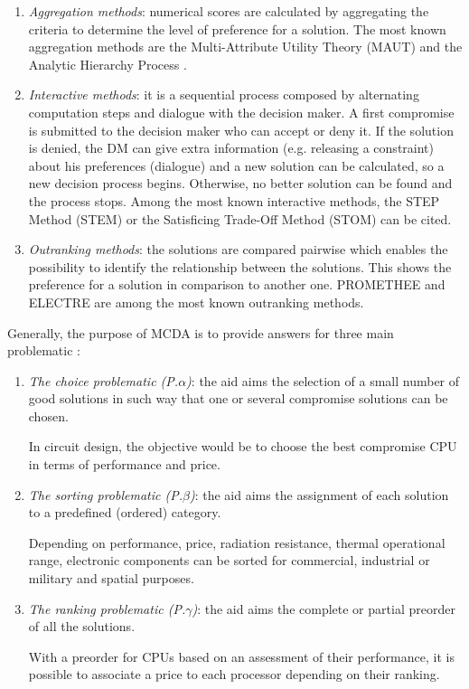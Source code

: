 \begin{enumerate}
\item \textit{Aggregation methods}: numerical scores are calculated by aggregating the criteria to determine the level of preference for a solution. The most known aggregation methods are the Multi-Attribute Utility Theory (MAUT) \cite{MMAUT} and the Analytic Hierarchy Process \cite{MAHP}.
\item \textit{Interactive methods}: it is a sequential process composed by alternating computation steps and dialogue with the decision maker. A first compromise is submitted to the decision maker who can accept or deny it. If the solution is denied, the DM can give extra information (e.g. releasing a constraint) about his preferences (dialogue) and a new solution can be calculated, so a new decision process begins. Otherwise, no better solution can be found and the process stops. Among the most known interactive methods, the STEP Method (STEM) \cite{benayoun71} or the Satisficing Trade-Off Method (STOM) \cite{nakayama84} can be cited.
\item \textit{Outranking methods}: the solutions are compared pairwise which enables the possibility to identify the relationship between the solutions. This shows the preference for a solution in comparison to another one. PROMETHEE \cite{Brans1} and ELECTRE \cite{Roy66} are among the most known outranking methods.
\end{enumerate}


Generally, the purpose of MCDA is to provide answers for three main problematic \cite{EhrgottFigueiraGreco2005}:
\begin{enumerate}
\item \textit{The choice problematic (P.$\alpha$)}: the aid aims the selection of a small number of good solutions in such way that one or several compromise solutions can be chosen.
\begin{example}
In circuit design, the objective would be to choose the best compromise CPU in terms of performance and price.
\end{example}
\item \textit{The sorting problematic (P.$\beta$)}: the aid aims the assignment of each solution to a predefined (ordered) category.
\begin{example}
Depending on performance, price, radiation resistance, thermal operational range, electronic components can be sorted for commercial, industrial or military and spatial purposes.
\end{example}
\item \textit{The ranking problematic (P.$\gamma$)}: the aid aims the complete or partial preorder of all the solutions.
\begin{example}
With a preorder for CPUs based on an assessment of their performance, it is possible to associate a price to each processor depending on their ranking.
\end{example}
\end{enumerate}

